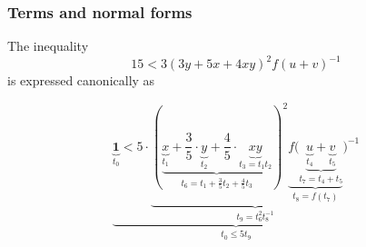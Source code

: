 \documentclass{beamer}
\begin{document}
\begin{frame}
 \frametitle{Terms and normal forms}
 The inequality 
 $$15 < 3 (3y + 5x + 4 x y)^2 f(u + v)^{-1}$$
 is expressed canonically as
% 
% 
% 

  {$$\underbrace{\underbrace{\mathbf{1}}_{t_0} < 5 \cdot \underbrace{(\underbrace{\underbrace{x}_{t_1} + \frac{3}{5} \cdot \underbrace{y}_{t_2} + \frac{4}{5} \cdot \underbrace{x y}_{t_3 = t_1 t_2}}_{t_6 = t_1 + \frac{3}{5}t_2 + \frac{4}{5}t_3})^2 \underbrace{f(\underbrace{\underbrace{u}_{t_4} + \underbrace{v}_{t_5}}_{t_7 = t_4 + t_5}}_{t_8 = f(t_7)})^{-1}}_{t_9 = t_6^2t_8^{-1}}}_{t_0 \leq 5t_9}$$}
 \end{frame}

\end{document}
